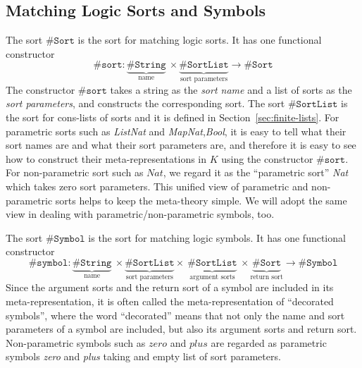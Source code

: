 \documentclass[UTF8,11pt]{article}
\theoremstyle{plain}
\theoremstyle{definition}
\theoremstyle{remark}
\newcommand{\Nat}{\textit{Nat}}
\newcommand{\Bool}{\textit{Bool}}
\newcommand{\List}{\textit{List}}
\newcommand{\Map}{\textit{Map}}
\newcommand{\parametric}[2]{{#1}\raisebox{.2ex}{\texttt{\footnotesize{\{}}}#2\raisebox{.2ex}{\texttt{\footnotesize{\}}}}}
\newcommand{\zero}{\textit{zero}}
\newcommand{\sharpsymbol}{\#}
\newcommand{\KString}{\texttt{\sharpsymbol String}}
\newcommand{\KSort}{\texttt{\sharpsymbol Sort}}
\newcommand{\Ksort}{\texttt{\sharpsymbol sort}}
\newcommand{\KSymbol}{\texttt{\sharpsymbol Symbol}}
\newcommand{\Ksymbol}{\texttt{\sharpsymbol symbol}}
\newcommand{\KSortList}{\texttt{\sharpsymbol SortList}}
\begin{document}
\subsection{Matching Logic Sorts and Symbols}
\label{sec:ML-sorts-symbols}

The sort $\KSort$ is the sort for matching logic sorts.
It has one functional constructor
$$
\Ksort \colon \underbrace{\KString}_\text{name}\  \times 
\underbrace{\KSortList}_\text{sort parameters} \to \KSort
$$
The constructor $\Ksort$ takes a string as the \emph{sort name} and a list of 
sorts as the \emph{sort parameters},
and constructs the corresponding sort.
The sort $\KSortList$ is the sort for cons-lists of sorts and it is defined in 
Section~\ref{sec:finite-lists}.
For parametric sorts such as \parametric{\List}{\Nat} and 
\parametric{\Map}{\Nat,\Bool}, it is easy to tell what their sort names are and 
what their sort parameters are, and therefore it is easy to see how to 
construct their meta-representations in $K$ using the constructor $\Ksort$.
For non-parametric sort such as $\Nat$, we regard it as the ``parametric sort'' 
\parametric{\Nat}{} which takes zero sort parameters.
This unified view of parametric and non-parametric sorts helps to keep the 
meta-theory simple.
We will adopt the same view in dealing with parametric/non-parametric symbols,
too.

The sort $\KSymbol$ is the sort for matching logic symbols.
It has one functional constructor
\begin{equation*}
\Ksymbol \colon {\underbrace{\KString}_\text{name}}\ 
\times 
\underbrace{\KSortList}_\text{sort parameters} 
\times\ 
\underbrace{\KSortList}_\text{argument sorts} \ 
\times \underbrace{\KSort}_\text{return sort} \to 
\KSymbol
\end{equation*}
Since the argument sorts and the return sort of a symbol are included in its 
meta-representation, it is often called the meta-representation of ``decorated 
symbols'', where the word ``decorated'' means that not only the name and sort 
parameters of a symbol are included, but also its argument sorts and return 
sort.
Non-parametric symbols such as $\zero$ and $\textit{plus}$ are regarded
as parametric symbols \parametric{\zero}{} and 
\parametric{\textit{plus}}{} taking and empty list of sort parameters.
\end{document}
